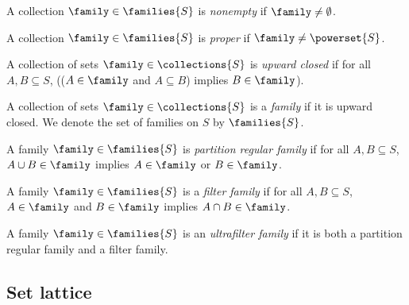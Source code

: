 \begin{definition}
    A collection $\family \in \families{S}$ is \emph{nonempty} if $\family \neq \emptyset$.
\end{definition}

\begin{definition}
    A collection $\family \in \families{S}$ is \emph{proper} if $\family \neq \powerset{S}$.
\end{definition}

\begin{definition}
    A collection of sets $\family \in \collections{S}$ is \emph{upward closed} if for all $A, B \subseteq S$, (($A \in \family$ and $A \subseteq B$) implies $B \in \family$).
\end{definition}

\begin{definition}
    A collection of sets $\family \in \collections{S}$ is a \emph{family} if it is upward closed.  We denote the set of families on $S$ by $\families{S}$.
\end{definition}

\begin{definition}
    A family $\family \in \families{S}$ is \emph{partition regular family} if for all $A, B \subseteq S$, $A \cup B \in \family$ implies $A \in \family$ or $B \in \family$.
\end{definition}

\begin{definition}
    A family $\family \in \families{S}$ is a \emph{filter family} if for all $A, B \subseteq S$, $A \in \family$ and $B \in \family$ implies $A \cap B \in \family$.
\end{definition}

\begin{definition}
    A family $\family \in \families{S}$ is an \emph{ultrafilter family} if it is both a partition regular family and a filter family.
\end{definition}

\subsection{Set lattice}

